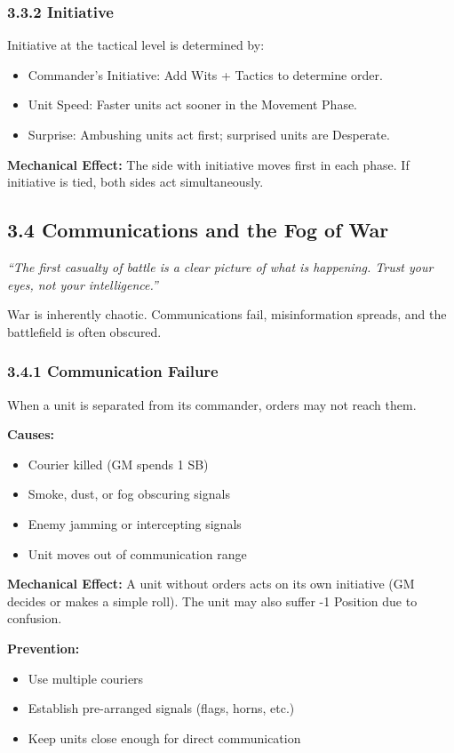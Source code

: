 \documentclass[11pt]{article}
\begin{document}
\subsubsection{3.3.2 Initiative}

Initiative at the tactical level is determined by:
\begin{itemize}
  \item Commander's Initiative: Add Wits + Tactics to determine order.
  \item Unit Speed: Faster units act sooner in the Movement Phase.
  \item Surprise: Ambushing units act first; surprised units are Desperate.
\end{itemize}

\textbf{Mechanical Effect:} The side with initiative moves first in each phase. If initiative is tied, both sides act simultaneously.

\subsection{3.4 Communications and the Fog of War}

\textit{``The first casualty of battle is a clear picture of what is happening. Trust your eyes, not your intelligence.''}

War is inherently chaotic. Communications fail, misinformation spreads, and the battlefield is often obscured.

\subsubsection{3.4.1 Communication Failure}

When a unit is separated from its commander, orders may not reach them.

\textbf{Causes:}
\begin{itemize}
  \item Courier killed (GM spends 1 SB)
  \item Smoke, dust, or fog obscuring signals
  \item Enemy jamming or intercepting signals
  \item Unit moves out of communication range
\end{itemize}

\textbf{Mechanical Effect:} A unit without orders acts on its own initiative (GM decides or makes a simple roll). The unit may also suffer -1 Position due to confusion.

\textbf{Prevention:}
\begin{itemize}
  \item Use multiple couriers
  \item Establish pre-arranged signals (flags, horns, etc.)
  \item Keep units close enough for direct communication
\end{itemize}
\end{document}
